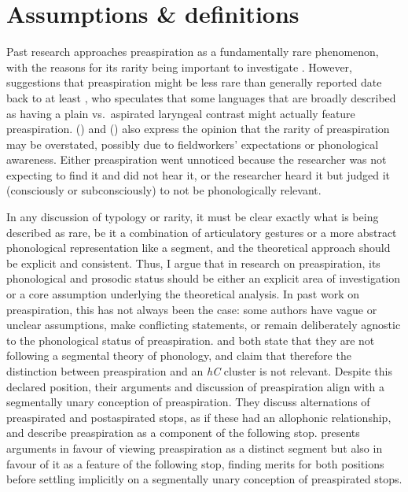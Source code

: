 \documentclass[output=paper,colorlinks,citecolor=brown]{langscibook}
\begin{document}
\section{Assumptions \& definitions}
\label{sec-assumptions}

Past research approaches preaspiration as a fundamentally rare phenomenon, with the reasons for its rarity being important to investigate \citep[e.g.,][]{Silverman2003}. However, suggestions that preaspiration might be less rare than generally reported date back to at least \citet{nichasaide1985}, who speculates that some languages that are broadly described as having a plain vs.~aspirated laryngeal contrast might actually feature preaspiration. \citeauthor{hejna2015} (\citeyear{hejna2015, hejna2019, chapters/16_Hejná}) and \citeauthor{iosad2017-mfm} (\citeyear{iosad2017-mfm,iosad2018,chapters/02_Iosad}) also express the opinion that the rarity of preaspiration may be overstated, possibly due to fieldworkers' expectations or phonological awareness. Either preaspiration went unnoticed because the researcher was not expecting to find it and did not hear it, or the researcher heard it but judged it (consciously or subconsciously) to not be phonologically relevant.

\largerpage[-1]
In any discussion of typology or rarity, it must be clear exactly what is being described as rare, be it a combination of articulatory gestures or a more abstract phonological representation like a segment, and the theoretical approach should be explicit and consistent. Thus, I argue that in research on preaspiration, its phonological and prosodic status should be either an explicit area of investigation or a core assumption underlying the theoretical analysis. In past work on preaspiration, this has not always been the case: some authors have vague or unclear assumptions, make conflicting statements, or remain deliberately agnostic to the phonological status of preaspiration. \citet{Helgason2002} and \citet{Silverman2003} both state that they are not following a segmental theory of phonology, and claim that therefore the distinction between preaspiration and an \textit{hC} cluster is not relevant. Despite this declared position, their arguments and discussion of preaspiration align with a segmentally unary conception of preaspiration. They discuss alternations of preaspirated and postaspirated stops, as if these had an allophonic relationship, and describe preaspiration as a component of the following stop. \citet{Clayton:2010} presents arguments in favour of viewing preaspiration as a distinct segment but also in favour of it as a feature of the following stop, finding merits for both positions before settling implicitly on a segmentally unary conception of preaspirated stops.
\end{document}
